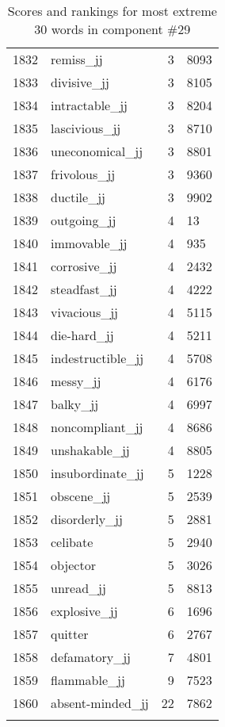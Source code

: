 \begin{longtable}[!htbp]{| rlr@{.}l |}
    1832 & remiss\_jj & 3 & 8093 \\
    1833 & divisive\_jj & 3 & 8105 \\
    1834 & intractable\_jj & 3 & 8204 \\
    1835 & lascivious\_jj & 3 & 8710 \\
    1836 & uneconomical\_jj & 3 & 8801 \\
    1837 & frivolous\_jj & 3 & 9360 \\
    1838 & ductile\_jj & 3 & 9902 \\
    1839 & outgoing\_jj & 4 & 13 \\
    1840 & immovable\_jj & 4 & 935 \\
    1841 & corrosive\_jj & 4 & 2432 \\
    1842 & steadfast\_jj & 4 & 4222 \\
    1843 & vivacious\_jj & 4 & 5115 \\
    1844 & die-hard\_jj & 4 & 5211 \\
    1845 & indestructible\_jj & 4 & 5708 \\
    1846 & messy\_jj & 4 & 6176 \\
    1847 & balky\_jj & 4 & 6997 \\
    1848 & noncompliant\_jj & 4 & 8686 \\
    1849 & unshakable\_jj & 4 & 8805 \\
    1850 & insubordinate\_jj & 5 & 1228 \\
    1851 & obscene\_jj & 5 & 2539 \\
    1852 & disorderly\_jj & 5 & 2881 \\
    1853 & celibate & 5 & 2940 \\
    1854 & objector & 5 & 3026 \\
    1855 & unread\_jj & 5 & 8813 \\
    1856 & explosive\_jj & 6 & 1696 \\
    1857 & quitter & 6 & 2767 \\
    1858 & defamatory\_jj & 7 & 4801 \\
    1859 & flammable\_jj & 9 & 7523 \\
    1860 & absent-minded\_jj & 22 & 7862 \\
    \hline
    \caption{Scores and rankings for most extreme 30 words in component \#29} \\
\end{longtable}
